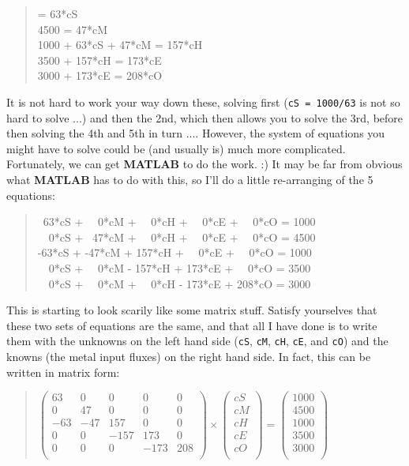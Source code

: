 \documentclass{tufte-book} %
\newenvironment{docspec}{\begin{quotation}\ttfamily\parskip0pt\parindent0pt\ignorespaces}{\end{quotation}}
\begin{document}
\begin{docspec}
1000 = 63*cS 
\\4500 = 47*cM
\\1000 + 63*cS + 47*cM = 157*cH
\\3500 + 157*cH = 173*cE
\\3000 + 173*cE = 208*cO
\end{docspec}

It is not hard to work your way down these, solving first (\texttt{cS = 1000/63} is not so hard to solve ...) and then the 2nd, which then allows you to solve the 3rd, before then solving the 4th and 5th in turn .... However, the system of equations you might have to solve could be (and usually is) much more complicated. Fortunately, we can get \textbf{MATLAB} to do the work. :) It may be far from obvious what \textbf{MATLAB} has to do with this, so I'll do a little re-arranging of the 5 equations:

\begin{docspec}
\ 63*cS + \ \ 0*cM + \ \ 0*cH + \ \ 0*cE +  \ \ 0*cO = 1000
\\\ \ 0*cS + \ 47*cM + \ \  0*cH + \ \ 0*cE +  \ \ 0*cO = 4500
\\ -63*cS + -47*cM + 157*cH + \ \ 0*cE +  \ \ 0*cO = 1000 
\\\ \ 0*cS + \ \ 0*cM - 157*cH + 173*cE +  \ \ 0*cO = 3500
\\\ \ 0*cS + \ \ 0*cM + \ \ 0*cH - 173*cE + 208*cO = 3000 
\end{docspec}

This is starting to look scarily like some matrix stuff. Satisfy yourselves that these two sets of equations  are the same, and that all I have done is to write them with the unknowns on the left hand side (\texttt{cS}, \texttt{cM}, \texttt{cH}, \texttt{cE}, and \texttt{cO}) and the knowns (the metal input fluxes) on the right hand side. In fact, this can be written in matrix form:

\begin{docspec}
\(\begin{pmatrix}
63 & 0 & 0 & 0 & 0 \\
0 & 47 & 0 & 0 & 0 \\
-63 & -47 & 157 & 0 & 0 \\
0 & 0 & -157 & 173 & 0 \\
0 & 0 & 0 & -173 & 208 \\
\end{pmatrix}
\times
\begin{pmatrix}
cS \\
cM \\
cH \\
cE \\
cO \\
\end{pmatrix}
=
\begin{pmatrix}
1000 \\
4500 \\
1000 \\
3500 \\
3000 \\
\end{pmatrix}\)
\end{docspec}
\end{document}

